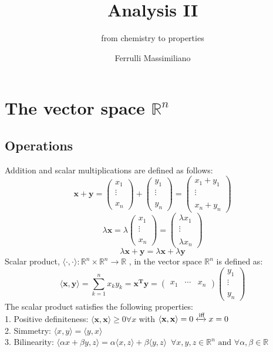 \documentclass[a4paper,11pt]{article}
\newcommand{\icol}[1]{%
  \left(\begin{smallmatrix}#1\end{smallmatrix}\right)%
}
\newcommand{\irow}[1]{%
  \left(\begin{smallmatrix}#1\end{smallmatrix}\right)%
}
\renewcommand{\iff}{
  \xleftrightarrow{\text{iff}}
}
\newcommand{\bk}[1]{
  \langle {#1} \rangle
}
\begin{document}
\title{Analysis II}
\subtitle{from chemistry to properties}
\author{Ferrulli Massimiliano}  

\maketitle





\tableofcontents





\pagebreak



\section{The vector space $\mathbb{R}^n$}
\subsection{Operations}
Addition and scalar multiplications are defined as follows:
$$\mathbf{x+y} = \icol{x_1\\\vdots\\ \\ x_n} + \icol{y_1 \\ \vdots \\ \\ y_n } = \icol{x_1 + y_1 \\ \vdots \\ \\ x_n + y_n} $$
$$ \lambda \mathbf{x} = \lambda \icol{x_1 \\ \vdots \\ \\ x_n} = \icol{\lambda x_1 \\ \vdots \\ \\ \lambda x_n} $$
$$ \lambda \mathbf{x+y} = \lambda \mathbf{x} + \lambda \mathbf{y} $$
Scalar product, $ \langle \cdot , \cdot \rangle : \mathbb{R}^n \times \mathbb{R}^n \to \mathbb{R}$ , in the vector space $\mathbb{R}^n$ is defined as:
$$\langle \mathbf{x,y} \rangle = \sum_{k = 1}^{n} x_k y_k = \mathbf{x^T y} = \irow{x_1 & \cdots & x_n } \icol{y_1 \\ \vdots \\ \\ y_n}  $$
The scalar product satisfies the following properties: \\
1. Positive definiteness: $\langle \mathbf{x,x} \rangle \geq 0  \forall x $ with  $ \langle \mathbf{x,x} \rangle = 0  \iff  x = 0  $ \\
2. Simmetry: $\bk{x,y} = \bk{y,x} $ \\
3. Bilinearity: $\bk{\alpha x + \beta y, z} = \alpha\bk{x,z} + \beta\bk{y,z} \, \, \, \forall x,y,z \in \mathbb{R}^n  \, \, \text{and} \, \, \forall \alpha , \beta \in \mathbb{R} $
\end{document}
